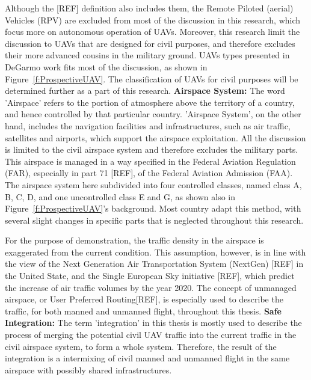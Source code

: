 Although the [REF] definition also includes them, the Remote Piloted (aerial) Vehicles (RPV) are excluded from most of the discussion in this research, which focus more on autonomous operation of UAVs. Moreover, this research limit the discussion to UAVs that are designed for civil purposes, and therefore excludes their more advanced cousins in the military ground. UAVs types presented in DeGarmo work fits most of the discussion, as shown in Figure~\ref{f:ProspectiveUAV}. The classification of UAVs for civil purposes will be determined further as a part of this research.
\newline \newline
\textbf{Airspace System:}  \qquad  The word 'Airspace' refers to the portion of atmosphere above the territory of a country, and hence controlled by that particular country. 'Airspace System', on the other hand, includes the navigation facilities and infrastructures, such as air traffic, satellites and airports, which support the airspace exploitation. All the discussion is limited to the civil airspace system and therefore excludes the military parts. This airspace is managed in a way specified in the Federal Aviation Regulation (FAR), especially in part 71 [REF], of the Federal Aviation Admission (FAA). The airspace system here subdivided into four controlled classes, named class  A, B, C, D, and one uncontrolled class E and G, as shown also in Figure~\ref{f:ProspectiveUAV}'s background. Most country adapt this method, with several slight changes in specific parts that is neglected throughout this research.

For the purpose of demonstration, the traffic density in the airspace is exaggerated from the current condition. This assumption, however, is in line with the view of the Next Generation Air Transportation System (NextGen) [REF] in the United State, and the Single European Sky initiative [REF], which predict the increase of air traffic volumes by the year 2020. The concept of unmanaged airspace, or User Preferred Routing[REF], is especially used to describe the traffic, for both manned and unmanned flight, throughout this thesis.
\newline \newline
\textbf{Safe Integration:}   \qquad  The term 'integration' in this thesis is mostly used to describe the process of merging the potential civil UAV traffic into the current traffic in the civil airspace system, to form a whole system. Therefore, the result of the integration is a intermixing of civil manned and unmanned flight in the same airspace with possibly shared infrastructures. 

